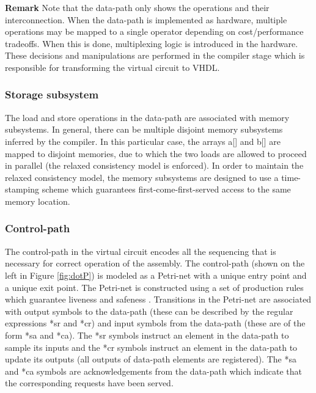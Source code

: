 \documentclass[conference]{IEEEtran}
\begin{document}
\noindent
{\bf Remark}
Note that the data-path only shows the operations and their interconnection.
When the data-path is implemented as hardware, multiple operations may
be mapped to a single operator depending on cost/performance tradeoffs.  When
this is done, multiplexing logic is introduced in the hardware.  These
decisions and manipulations are performed in the compiler stage which is
responsible for transforming the virtual circuit to VHDL.

\subsubsection{Storage subsystem}

The load and store operations in the data-path
are associated with memory subsystems.  In general, there
can be multiple disjoint memory subsystems inferred by the
compiler.  In this particular case, the arrays a[] and b[] 
are mapped to disjoint memories, due to which the two
loads are allowed to proceed in parallel (the relaxed consistency
model is enforced).
In order to maintain the relaxed consistency model, the
memory subsystems are designed to use a time-stamping 
scheme which guarantees first-come-first-served access to
the same memory location.

\subsubsection{Control-path}


The control-path in the virtual circuit encodes
all the sequencing that is necessary for correct
operation of the assembly.
The control-path (shown on the left
in Figure \ref{fig:dotP}) is modeled as a Petri-net with
a unique entry point and a unique exit point.  The Petri-net
is constructed using a set of production rules which guarantee
liveness and safeness \cite{c:ahir_dsd2010}.  Transitions in the Petri-net
are associated with output symbols to the data-path (these can
be described by the regular expressions *sr and *cr)
and input symbols from the data-path (these are of the form *sa and
*ca).  The *sr symbols instruct an element in the data-path to
sample its inputs and the *cr symbols instruct an element in the
data-path to update its outputs (all outputs of data-path elements
are registered).  The *sa and *ca symbols are acknowledgements
from the data-path which indicate that the corresponding requests
have been served.  
\end{document}
